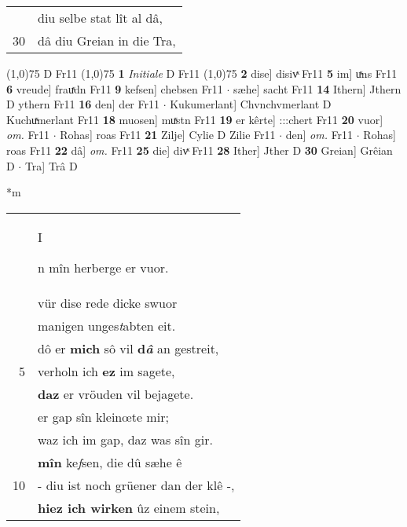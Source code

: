 \documentclass[8pt,a4paper,notitlepage]{article}
\begin{document}
\begin{table}[ht]
\begin{minipage}[t]{0.5\linewidth}
\begin{tabular}{rl}
 & diu selbe stat lît al dâ,\\ 
30 & dâ diu Greian in die Tra,\\ 
\end{tabular}
\scriptsize
\line(1,0){75} \newline
D Fr11 \newline
\line(1,0){75} \newline
\textbf{1} \textit{Initiale} D Fr11  \newline
\line(1,0){75} \newline
\textbf{2} dise] disivͯ Fr11 \textbf{5} im] uͯns Fr11 \textbf{6} vreude] frauͯdn Fr11 \textbf{9} kefsen] chebsen Fr11  $\cdot$ sæhe] sacht Fr11 \textbf{14} Ithern] Jthern D ythern Fr11 \textbf{16} den] der Fr11  $\cdot$ Kukumerlant] Chvnchvmerlant D Kuchuͯmerlant Fr11 \textbf{18} muosen] muͯstn Fr11 \textbf{19} er kêrte] :::chert Fr11 \textbf{20} vuor] \textit{om.} Fr11  $\cdot$ Rohas] roas Fr11 \textbf{21} Zilje] Cylie D Zilie Fr11  $\cdot$ den] \textit{om.} Fr11  $\cdot$ Rohas] roas Fr11 \textbf{22} dâ] \textit{om.} Fr11 \textbf{25} die] divͯ Fr11 \textbf{28} Ither] Jther D \textbf{30} Greian] Grêian D  $\cdot$ Tra] Trâ D \newline
\end{minipage}
\hspace{0.5cm}
\begin{minipage}[t]{0.5\linewidth}
\small
\begin{center}*m
\end{center}
\begin{tabular}{rl}
 & \begin{large}I\end{large}n mîn herberge er vuor.\\ 
 & vür dise rede  dicke swuor\\ 
 & manigen unges\textit{t}abten eit.\\ 
 & dô er \textbf{mich} sô vil \textbf{d\textit{â}} an gestreit,\\ 
5 & verholn ich \textbf{ez} im sagete,\\ 
 & \textbf{daz} er vröuden vil bejagete.\\ 
 & er gap sîn kleinœte mir;\\ 
 & waz ich im gap, daz was sîn gir.\\ 
 & \textbf{mîn} ke\textit{f}sen, die dû sæhe ê\\ 
10 & - diu ist noch grüener dan der klê -,\\ 
 & \textbf{hiez ich wirken} ûz einem stein,\\ 

\end{tabular}
\end{minipage}
\end{table}
\end{document}
